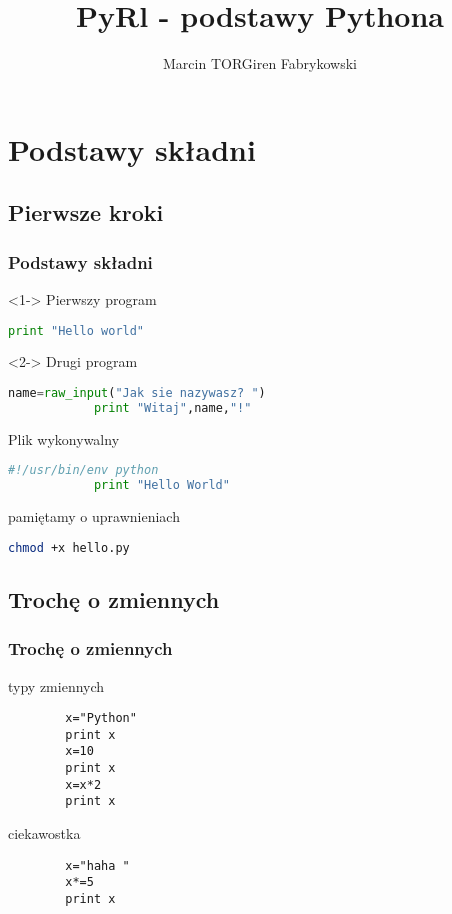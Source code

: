 \documentclass[10pt]{beamer}
\author{Marcin TORGiren Fabrykowski}
\institute{AGH - University of Science and Technology}
\title{PyRl - podstawy Pythona}
\begin{document}
\begin{frame}
	\titlepage
\end{frame}
\section{Podstawy składni}
\subsection{Pierwsze kroki}
\begin{frame}[fragile]
	\frametitle{Podstawy składni}
	\begin{block}<1->
		{Pierwszy program}
		\begin{lstlisting}[language=Python]
			print "Hello world"
		\end{lstlisting}
	\end{block}
	\begin{block}<2->
		{Drugi program}
		\begin{lstlisting}[language=Python]
			name=raw_input("Jak sie nazywasz? ")
			print "Witaj",name,"!"
		\end{lstlisting}
	\end{block}
\end{frame}
\begin{frame}[fragile]
	\begin{block}
		{Plik wykonywalny}
		\begin{lstlisting}[language=Python]
			#!/usr/bin/env python
			print "Hello World"
		\end{lstlisting}
	\end{block}
	\begin{block}
		{pamiętamy o uprawnieniach}
		\begin{lstlisting}[language=bash]
		chmod +x hello.py
		\end{lstlisting}
	\end{block}
\end{frame}
\subsection{Trochę o zmiennych}
\begin{frame}[fragile]
	\frametitle{Trochę o zmiennych}	
	\begin{block}
		{typy zmiennych}
		\begin{lstlisting}
		x="Python"
		print x
		x=10
		print x
		x=x*2
		print x
		\end{lstlisting}
	\end{block}
	\begin{block}
		{ciekawostka}
		\begin{lstlisting}
		x="haha "
		x*=5
		print x
		\end{lstlisting}
	\end{block}
\end{frame}
\end{document}
